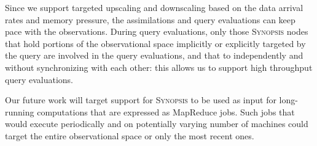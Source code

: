 \begin{description}[leftmargin=*]
\item[RQ-4:] Since we support targeted upscaling and downscaling based on the data arrival rates and memory pressure, the assimilations and query evaluations can keep pace with the observations. During query evaluations,  only those \textsc{Synopsis} nodes that hold portions of the observational space implicitly or explicitly targeted by the query are involved in the query evaluations, and that to independently and without synchronizing with each other: this allows us to support high throughput query evaluations.
\end{description}

Our future work will target support for \textsc{Synopsis} to be used as input for long-running computations that are expressed as MapReduce jobs. Such jobs that would execute periodically and on potentially varying number of machines could target the entire observational space or only the most recent ones.
